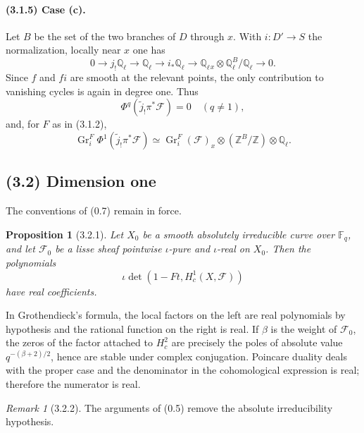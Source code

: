 \documentclass[11pt]{article}
\newtheorem{proposition}{Proposition}
\theoremstyle{remark}
\newtheorem{remark}{Remark}
\newcommand{\Ql}{\mathbb{Q}_\ell}
\newcommand{\Fq}{\mathbb{F}_q}
\begin{document}
\paragraph{(3.1.5) Case (c).}
Let $B$ be the set of the two branches of $D$ through $x$. With $i:D'\to S$ the normalization, locally near $x$ one has
\begin{equation}\tag{3.1.5.1}
0\to j_{!}\Ql\to \Ql\to i_{*}\Ql\to \Ql{}_{x}\otimes\Ql^B/\Ql\to0.
\end{equation}
Since $f$ and $fi$ are smooth at the relevant points, the only contribution to vanishing cycles is again in degree one. Thus
\begin{equation}\tag{3.1.5.3}
\Phi^q(\tilde j_{!}\pi^*\mathcal F)=0\quad(q\ne1),
\end{equation}
and, for $F$ as in (3.1.2),
\begin{equation}\tag{3.1.5.4}
\operatorname{Gr}^F_i\Phi^1(\tilde j_{!}\pi^*\mathcal F)
\simeq \operatorname{Gr}^F_i(\mathcal F)_x\otimes(\mathbb Z^B/\mathbb Z)\otimes\Ql .
\end{equation}

\subsection*{(3.2) Dimension one}

The conventions of (0.7) remain in force.

\begin{proposition}[3.2.1]
Let $X_0$ be a smooth absolutely irreducible curve over $\Fq$, and let $\mathcal F_0$ be a lisse sheaf pointwise $\iota$-pure and $\iota$-real on $X_0$. Then the polynomials
\[
\iota\det(1-Ft,H^1_c(X,\mathcal F))
\]
have real coefficients.
\end{proposition}

In Grothendieck's formula, the local factors on the left are real polynomials by hypothesis and the rational function on the right is real. If $\beta$ is the weight of $\mathcal F_0$, the zeros of the factor attached to $H^2_c$ are precisely the poles of absolute value $q^{-(\beta+2)/2}$, hence are stable under complex conjugation. Poincare duality deals with the proper case and the denominator in the cohomological expression is real; therefore the numerator is real.

\begin{remark}[3.2.2]
The arguments of (0.5) remove the absolute irreducibility hypothesis.
\end{remark}
\end{document}

